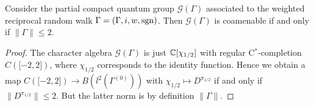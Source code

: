  \begin{Cor} Consider the partial compact quantum group $\mathscr{G}(\Gamma)$ associated to the weighted reciprocal random walk $\Gamma = (\Gamma,i,w,\operatorname{\mathrm{sgn}})$. Then $\mathscr{G}(\Gamma)$ is coamenable if and only if $\|\Gamma\| \leq 2$. 
 \end{Cor}
 \begin{proof}
 The character algebra $\mathscr{G}(\Gamma)$ is just $\mathbb{C}\lbrack \chi_{1/2}\rbrack$ with regular C$^*$-completion $C(\lbrack -2,2\rbrack)$, where $\chi_{1/2}$ corresponds to the identity function. Hence we obtain a map $C(\lbrack -2,2\rbrack) \rightarrow B(l^2(\Gamma^{(0)}))$ with $\chi_{1/2}\mapsto D^{\pi_{1/2}}$ if and only if $\|D^{\pi_{1/2}}\| \leq  2$.  
    But the latter norm is by definition $\|\Gamma\|$.   
 \end{proof} 